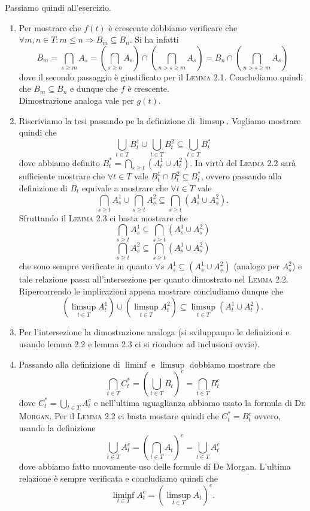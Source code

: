 Passiamo quindi all'esercizio.
\begin{enumerate}
\item Per mostrare che $ f(t) $ è crescente dobbiamo verificare che $ \forall m, n \in T : m \leq n \Rightarrow B_m \subseteq B_n $. Si ha infatti \[B_m = \bigcap_{s \geq m} A_s = \left( \bigcap_{s \geq n} A_s \right ) \cap \left( \bigcap_{n > s \geq m} A_s \right ) = B_n \cap \left( \bigcap_{n > s \geq m} A_s \right ) \] dove il secondo passaggio è giustificato per il \textsc{Lemma 2.1}. Concludiamo quindi che $ B_m \subseteq B_n $ e dunque che $ f $ è crescente. \\
  Dimostrazione analoga vale per $ g(t) $.
\item Riscriviamo la tesi passando pe la definizione di $ \limsup $. Vogliamo mostrare quindi che \[\bigcup_{t \in T} B_t^1 \cup \bigcup_{t \in T} B_t^2 \subseteq \bigcup_{t \in T} B_t^{*}\] dove abbiamo definito $ B_t^{*} = \bigcap_{s \geq t} (A_t^1 \cup A_t^2) $. In virtù del \textsc{Lemma 2.2} sarà sufficiente mostrare che $ \forall t \in T $ vale $ B_t^1 \cap B_t^2 \subseteq B_t^{*} $, ovvero passando alla definizione di $ B_t $ equivale a mostrare che $ \forall t \in T $ vale \[\bigcap_{s \geq t} A_s^1 \cup \bigcap_{s \geq t} A_s^2 \subseteq \bigcap_{s \geq t} (A_s^1 \cup A_s^2).\] Sfruttando il \textsc{Lemma 2.3} ci basta mostrare che \[\bigcap_{s \geq t} A_s^1 \subseteq \bigcap_{s \geq t} (A_s^1 \cup A_s^2)\] \[\bigcap_{s \geq t} A_s^2 \subseteq \bigcap_{s \geq t} (A_s^1 \cup A_s^2)\] che sono sempre verificate in quanto $ \forall s \; A_s^1 \subseteq (A_s^1 \cup A_s^2) $ (analogo per $ A_s^2 $) e tale relazione passa all'intersezione per quanto dimostrato nel \textsc{Lemma 2.2}. Ripercorrendo le implicazioni appena mostrare concludiamo dunque che \[(\limsup_{t \in T} A_t^1) \cup (\limsup_{t \in T}A_t^2) \subseteq \limsup_{t \in T} (A_t^1 \cup A_t^2).\]
\item Per l'intersezione la dimostrazione analoga (\textsf{si sviluppanpo le definizioni e usando lemma 2.2 e lemma 2.3 ci si rionduce ad inclusioni ovvie}).
\item Passando alla definizione di $ \liminf $ e $ \limsup $ dobbiamo mostrare che \[\bigcap_{t \in T} C_t^{*} = \left (\bigcup_{t \in T} B_t \right )^c = \bigcap_{t \in T} B_t^{c}\] dove $ C_t^{*} = \bigcup_{t \in T} A_t^c $ e nell'ultima uguaglianza abbiamo usato la formula di \textsc{De Morgan}. Per il \textsc{Lemma 2.2} ci basta mostare quindi che $ C_t^{*} = B_t^c $ ovvero, usando la definizione \[\bigcup_{t \in T} A_t^c = \left (\bigcap_{t \in T} A_t \right )^c = \bigcup_{t \in T} A_t^{c}\] dove abbiamo fatto nuovamente uso delle formule di De Morgan. L'ultima relazione è sempre verificata e concludiamo quindi che \[\liminf_{t \in T} A_t^c = (\limsup_{t \in T} A_t)^c.\]

\end{enumerate}
